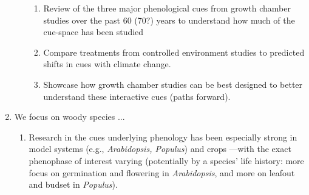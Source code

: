 \documentclass[11pt,letterpaper]{article}
\begin{document}
\begin{enumerate}
\begin{enumerate}
\begin{enumerate}
\item Review of the three major phenological cues from growth chamber studies over the past 60 (70?) years to understand how much of the cue-space has been studied
\item Compare treatments from controlled environment studies to predicted shifts in cues with climate change.  
\item Showcase how growth chamber studies can be best designed to better understand these interactive cues (paths forward). 
\end{enumerate}
\end{enumerate}
\item We focus on woody species ...
\begin{enumerate}
\item Research in the cues underlying phenology has been especially strong in model systems (e.g., \emph{Arabidopsis, Populus}) and crops \citep{cesaraccio2004}---with the exact phenophase of interest varying (potentially by a species' life history: more focus on germination and flowering in \emph{Arabidopsis}, and more on leafout and budset in \emph{Populus}).


\end{enumerate}
\end{enumerate}
\end{document}
